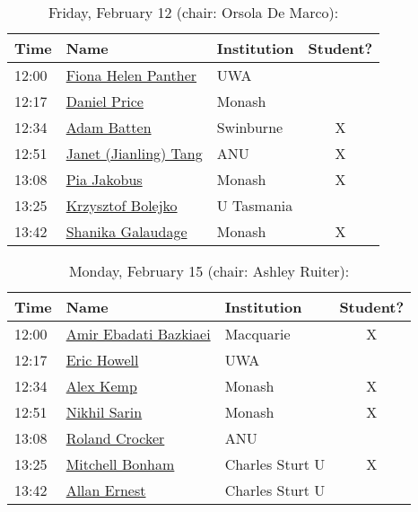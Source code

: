 \documentclass[amsmath,onecolumn]{revtex4-1}
\begin{document}
\begin{table}[!htbp]
	\centering
	\caption{Friday, February 12 (chair: Orsola De Marco):}
\begin{tabular}{| l | l | l | c |}
	\hline
	Time & Name  & Institution & Student? \\ 		
	\hline
	12:00 & \href{https://forms.gle/bZz2KNKeq9Sgx4bN7}{Fiona Helen Panther}  & UWA &  \\
	12:17 & \href{https://forms.gle/SeXaaVuk5Kjkj2Gp8}{Daniel Price} & Monash & \\
	12:34 & \href{https://forms.gle/CvUMW6DxeHCoNUYDA}{Adam Batten} & Swinburne & X \\
	12:51 & \href{https://forms.gle/CB2tycKLop6j5qnX8}{Janet (Jianling) Tang} & ANU & X \\
	13:08 & \href{https://forms.gle/7ZNMYiRSej84rja79}{Pia Jakobus} & Monash & X \\
	13:25 & \href{https://forms.gle/2K3YNcxBfqEpitnNA}{Krzysztof Bolejko} & U Tasmania  &	\\
	13:42 & \href{https://forms.gle/fSuaVDvJ5TiVxrKy9}{Shanika Galaudage} & Monash & X\\
	\hline
\end{tabular}
\end{table}

\begin{table}[!htbp]
	\centering
	\caption{Monday, February 15 (chair: Ashley Ruiter):}
\begin{tabular}{| l | l | l | c |}
	\hline
	Time & Name  & Institution & Student? \\ 		
	\hline
	12:00 & \href{https://forms.gle/mUYC1TzhTpjK5qSx6}{Amir Ebadati Bazkiaei} & Macquarie & X \\
	12:17 & \href{https://forms.gle/ykB4nvyVz4LPjCS5A}{Eric Howell} & UWA &\\
	12:34 & \href{https://forms.gle/pBPLKKWqjogAG22w6}{Alex Kemp} &  Monash & X\\
	12:51 & \href{https://forms.gle/6fpxyrUcNT8eADZY7}{Nikhil Sarin} & Monash & X   \\
	13:08 & \href{https://forms.gle/14RQCWHA9Essh6ZK9}{Roland Crocker} & ANU & \\
	13:25 & \href{https://forms.gle/tLjJa6MEMgfoqBLb9}{Mitchell Bonham} & Charles Sturt U  & X\\
	13:42 & \href{https://forms.gle/cypNduJW9ZtThT2N7}{Allan Ernest} & Charles Sturt U & \\
	\hline
\end{tabular}
\end{table}
\end{document}
